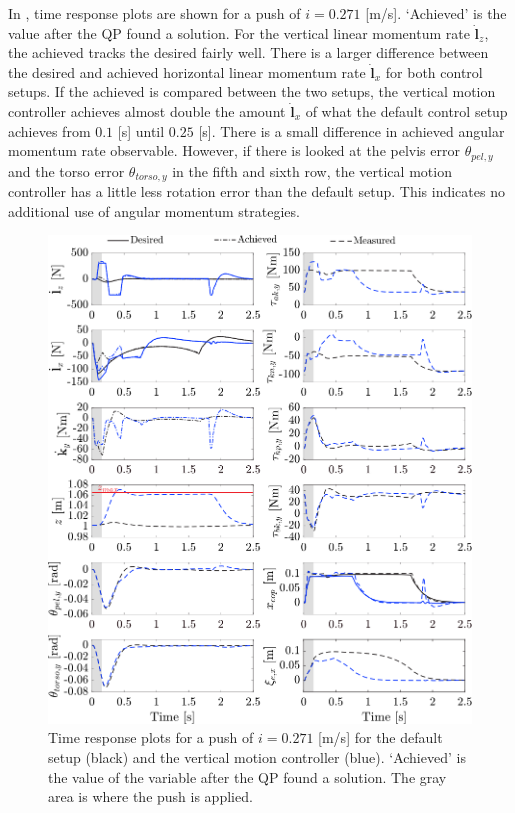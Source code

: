 In , time response plots are shown for a push of $i=0.271$ [m/s]. `Achieved' is the value after the \ac{QP} found a solution. For the vertical linear momentum rate $\dot{\mathbf{l}}_z$, the achieved tracks the desired fairly well. There is a larger difference between the desired and achieved horizontal linear momentum rate $\dot{\mathbf{l}}_x$ for both control setups. If the achieved is compared between the two setups, the vertical motion controller achieves almost double the amount $\dot{\mathbf{l}}_x$ of what the default control setup achieves from $0.1$ [s] until $0.25$ [s]. There is a small difference in achieved angular momentum rate observable. However, if there is looked at the pelvis error $\theta_{pel,y}$ and the torso error $\theta_{torso,y}$ in the fifth and sixth row, the vertical motion controller has a little less rotation error than the default setup. This indicates no additional use of angular momentum strategies.
\begin{figure}
\centering
\includegraphics[width=1.0\textwidth]{STYLESTUFF/valcomparetime.png}
\caption{Time response plots for a push of $i=0.271$ [m/s] for the default setup (black) and the vertical motion controller (blue). `Achieved' is the value of the variable after the \ac{QP} found a solution. The gray area is where the push is applied.}
\label{fig:valcomparetime}
\end{figure}

